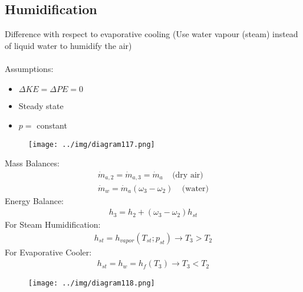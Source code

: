 \documentclass[class=report, crop=false, 12pt,a4paper]{standalone}
\numberwithin{equation}{section}
\begin{document}
\subsection{Humidification}
Difference with respect to evaporative cooling (Use water vapour (steam) instead of liquid water to humidify the air) \\\\
Assumptions: 
\begin{itemize}[noitemsep]
  \item $\Delta KE = \Delta PE = 0$
  \item Steady state
  \item $p =$ constant
\end{itemize}
\begin{figure}[H]
  \centering
  \texttt{[image: ../img/diagram117.png]}
  \caption{}
\end{figure}
Mass Balances:
\begin{gather}
  \dot{m}_{a,2} = \dot{m}_{a,3} = \dot{m}_{a} \ \ \ \ \ \text{(dry air)} \\[5pt]
  \dot{m}_{w} = \dot{m}_{a}(\omega_3-\omega_2) \ \ \ \ \ \text{(water)}
\end{gather}
Energy Balance:
\begin{gather}
  h_3 = h_2 + (\omega_3-\omega_2)h_{st}
\end{gather}
For Steam Humidification:
\begin{gather}
  h_{st} = h_{vapor}(T_{st};p_{st}) \longrightarrow T_3>T_2
\end{gather}
For Evaporative Cooler:
\begin{gather}
  h_{st} = h_{w} = h_{f}(T_3) \longrightarrow T_3<T_2
\end{gather}
\begin{figure}[H]
  \centering
  \texttt{[image: ../img/diagram118.png]}
  \caption{}
\end{figure}
\end{document}

